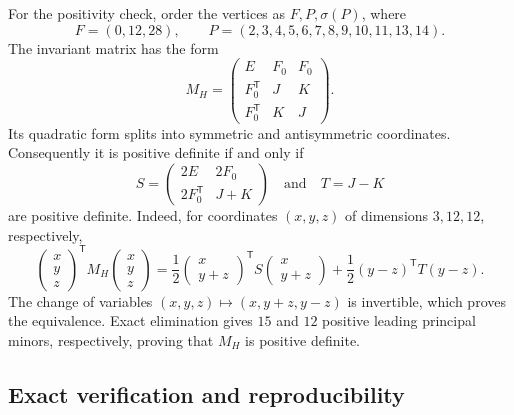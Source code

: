 For the positivity check, order the vertices as $F,P,\sigma(P)$, where
\[
 F=(0,12,28),\qquad P=(2,3,4,5,6,7,8,9,10,11,13,14).
\]
The invariant matrix has the form
\[
 M_H=\begin{pmatrix}E&F_0&F_0\\
 F_0^{\mathsf T}&J&K\\F_0^{\mathsf T}&K&J\end{pmatrix}.
\]
Its quadratic form splits into symmetric and antisymmetric coordinates.
Consequently it is positive definite if and only if
\[
 S=\begin{pmatrix}2E&2F_0\\2F_0^{\mathsf T}&J+K\end{pmatrix}
 \quad\text{and}\quad T=J-K
\]
are positive definite. Indeed, for coordinates $(x,y,z)$ of dimensions
$3,12,12$, respectively,
\[
 \begin{pmatrix}x\\y\\z\end{pmatrix}^{\mathsf T}
 M_H\begin{pmatrix}x\\y\\z\end{pmatrix}
 =\frac12\begin{pmatrix}x\\y+z\end{pmatrix}^{\mathsf T}
 S\begin{pmatrix}x\\y+z\end{pmatrix}
 +\frac12(y-z)^{\mathsf T}T(y-z).
\]
The change of variables $(x,y,z)\mapsto(x,y+z,y-z)$ is invertible,
which proves the equivalence. Exact elimination gives $15$ and $12$ positive
leading principal minors, respectively, proving that $M_H$ is positive
definite.

\subsection{Exact verification and reproducibility}\label{subsix:app:verification}

